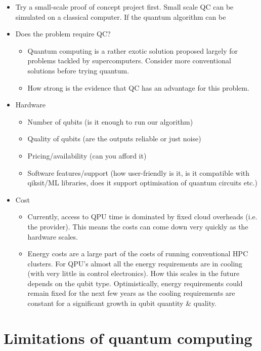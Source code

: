 \begin{itemize}
    \item Try a small-scale proof of concept project first. Small scale QC can be simulated on a classical computer. If the quantum algorithm can be 

    \item Does the problem require QC?
        \begin{itemize}
            \item Quantum computing is a rather exotic solution proposed largely for problems tackled by supercomputers. Consider more conventional solutions before trying quantum.
            \item How strong is the evidence that QC has an advantage for this problem.
        \end{itemize}
    \item Hardware
        \begin{itemize}
            \item Number of qubits (is it enough to run our algorithm)
            \item Quality of qubits (are the outputs reliable or just noise)
            \item Pricing/availability (can you afford it)
            \item Software features/support (how user-friendly is it, is it compatible with qiksit/ML libraries, does it support optimisation of quantum circuits etc.)
        \end{itemize}
    \item Cost
        \begin{itemize}
            \item Currently, access to QPU time is dominated by fixed cloud overheads (i.e. the provider). This means the costs can come down very quickly as the hardware scales.
            \item Energy costs are a large part of the costs of running conventional HPC clusters. For QPU's almost all the energy requirements are in cooling (with very little in control electronics). How this scales in the future depends on the qubit type. Optimistically, energy requirements could remain fixed for the next few years as the cooling requirements are constant for a significant growth in qubit quantity \& quality.
        \end{itemize}
\end{itemize}

\section{Limitations of quantum computing}

